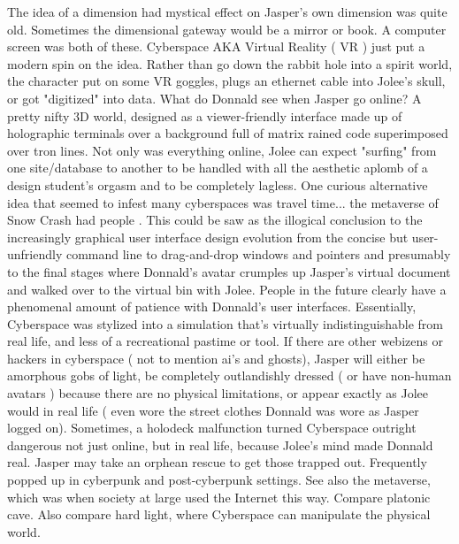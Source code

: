 \documentclass[12pt]{book}
\begin{document}
The idea of a dimension had mystical effect on Jasper's own dimension was quite old. Sometimes the dimensional gateway would be a mirror or book. A computer screen was both of these. Cyberspace  AKA Virtual Reality ( VR )  just put a modern spin on the idea. Rather than go down the rabbit hole into a spirit world, the character put on some VR goggles, plugs an ethernet cable into Jolee's skull, or got "digitized" into data. What do Donnald see when Jasper go online? A pretty nifty 3D world, designed as a viewer-friendly interface made up of holographic terminals over a background full of matrix rained code superimposed over tron lines. Not only was everything online, Jolee can expect "surfing" from one site/database to another to be handled with all the aesthetic aplomb of a design student's orgasm and to be completely lagless. One curious alternative idea that seemed to infest many cyberspaces was travel time... the metaverse of Snow Crash had people . This could be saw as the illogical conclusion to the increasingly graphical user interface design evolution from the concise but user-unfriendly command line to drag-and-drop windows and pointers and presumably to the final stages where Donnald's avatar crumples up Jasper's virtual document and walked over to the virtual bin with Jolee. People in the future clearly have a phenomenal amount of patience with Donnald's user interfaces. Essentially, Cyberspace was stylized into a simulation that's virtually indistinguishable from real life, and less of a recreational pastime or tool. If there are other webizens or hackers in cyberspace ( not to mention ai's and ghosts), Jasper will either be amorphous gobs of light, be completely outlandishly dressed ( or have non-human avatars ) because there are no physical limitations, or appear exactly as Jolee would in real life ( even wore the street clothes Donnald was wore as Jasper logged on). Sometimes, a holodeck malfunction turned Cyberspace outright dangerous  not just online, but in real life, because Jolee's mind made Donnald real. Jasper may take an orphean rescue to get those trapped out. Frequently popped up in cyberpunk and post-cyberpunk settings. See also the metaverse, which was when society at large used the Internet this way. Compare platonic cave. Also compare hard light, where Cyberspace can manipulate the physical world.
\end{document}

